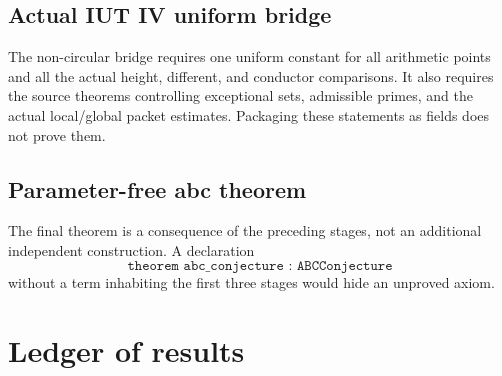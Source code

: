 \documentclass[11pt]{amsart}
\theoremstyle{definition}
\theoremstyle{remark}
\begin{document}
\subsection{Actual IUT IV uniform bridge}
The non-circular bridge requires one uniform constant for all arithmetic
points and all the actual height, different, and conductor comparisons.  It
also requires the source theorems controlling exceptional sets, admissible
primes, and the actual local/global packet estimates.  Packaging these
statements as fields does not prove them.

\subsection{Parameter-free abc theorem}
The final theorem is a consequence of the preceding stages, not an additional
independent construction.  A declaration
\[
 \texttt{theorem abc\_conjecture : ABCConjecture}
\]
without a term inhabiting the first three stages would hide an unproved axiom.

\section{Ledger of results}
\end{document}
